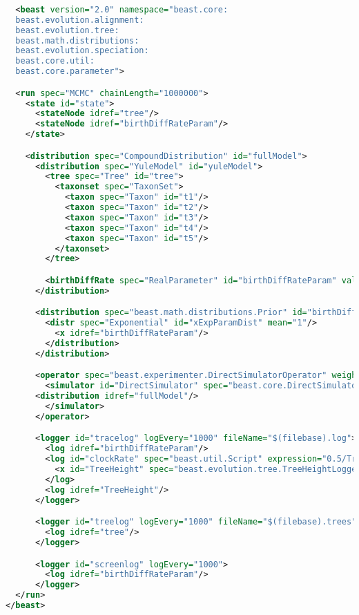 \documentclass[oneside]{article}
\begin{document}
{\small
\singlespacing
\begin{lstlisting}[language=XML, caption=BEAST 2 control file for
  direct simulation of a birth-death model., label={lst:bddirect}]
  
  <beast version="2.0" namespace="beast.core:
  beast.evolution.alignment:
  beast.evolution.tree:
  beast.math.distributions:
  beast.evolution.speciation:
  beast.core.util:
  beast.core.parameter">

  <run spec="MCMC" chainLength="1000000">
    <state id="state">
      <stateNode idref="tree"/>
      <stateNode idref="birthDiffRateParam"/>
    </state>

    <distribution spec="CompoundDistribution" id="fullModel">
      <distribution spec="YuleModel" id="yuleModel">
        <tree spec="Tree" id="tree">
          <taxonset spec="TaxonSet">
            <taxon spec="Taxon" id="t1"/>
            <taxon spec="Taxon" id="t2"/>
            <taxon spec="Taxon" id="t3"/>
            <taxon spec="Taxon" id="t4"/>
            <taxon spec="Taxon" id="t5"/>
          </taxonset>
        </tree>

        <birthDiffRate spec="RealParameter" id="birthDiffRateParam" value="1.0">
      </distribution>

      <distribution spec="beast.math.distributions.Prior" id="birthDiffRatePrior">
        <distr spec="Exponential" id="xExpParamDist" mean="1"/>
          <x idref="birthDiffRateParam"/>
        </distribution>
      </distribution>

      <operator spec="beast.experimenter.DirectSimulatorOperator" weight="1" state="@state">
        <simulator id="DirectSimulator" spec="beast.core.DirectSimulator" nSamples="1">
	  <distribution idref="fullModel"/>
        </simulator>
      </operator>

      <logger id="tracelog" logEvery="1000" fileName="$(filebase).log">
        <log idref="birthDiffRateParam"/>
        <log id="clockRate" spec="beast.util.Script" expression="0.5/TreeHeight">
          <x id="TreeHeight" spec="beast.evolution.tree.TreeHeightLogger" tree="@tree"/>
        </log>
        <log idref="TreeHeight"/>
      </logger>

      <logger id="treelog" logEvery="1000" fileName="$(filebase).trees">
        <log idref="tree"/>
      </logger>

      <logger id="screenlog" logEvery="1000">
        <log idref="birthDiffRateParam"/>
      </logger>
  </run>
</beast>
\end{lstlisting}
}


\clearpage



\end{document}
